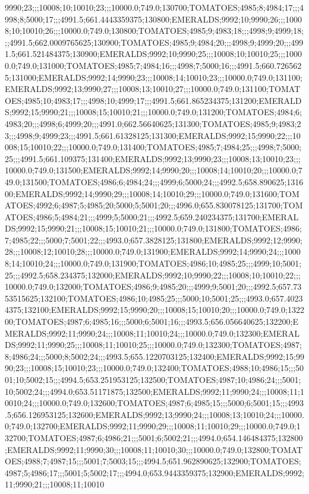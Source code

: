 9990;23;;;10008;10;10010;23;;;10000.0;749.0;130700;TOMATOES;4985;8;4984;17;;;4998;8;5000;17;;;4991.5;661.4443359375;130800;EMERALDS;9992;10;9990;26;;;10008;10;10010;26;;;10000.0;749.0;130800;TOMATOES;4985;9;4983;18;;;4998;9;4999;18;;;4991.5;662.0009765625;130900;TOMATOES;4985;9;4984;20;;;4998;9;4999;20;;;4991.5;661.521484375;130900;EMERALDS;9992;10;9990;25;;;10008;10;10010;25;;;10000.0;749.0;131000;TOMATOES;4985;7;4984;16;;;4998;7;5000;16;;;4991.5;660.7265625;131000;EMERALDS;9992;14;9990;23;;;10008;14;10010;23;;;10000.0;749.0;131100;EMERALDS;9992;13;9990;27;;;10008;13;10010;27;;;10000.0;749.0;131100;TOMATOES;4985;10;4983;17;;;4998;10;4999;17;;;4991.5;661.865234375;131200;EMERALDS;9992;15;9990;21;;;10008;15;10010;21;;;10000.0;749.0;131200;TOMATOES;4984;6;4983;20;;;4998;6;4999;20;;;4991.0;662.56640625;131300;TOMATOES;4985;9;4983;23;;;4998;9;4999;23;;;4991.5;661.61328125;131300;EMERALDS;9992;15;9990;22;;;10008;15;10010;22;;;10000.0;749.0;131400;TOMATOES;4985;7;4984;25;;;4998;7;5000;25;;;4991.5;661.109375;131400;EMERALDS;9992;13;9990;23;;;10008;13;10010;23;;;10000.0;749.0;131500;EMERALDS;9992;14;9990;20;;;10008;14;10010;20;;;10000.0;749.0;131500;TOMATOES;4986;6;4984;24;;;4999;6;5000;24;;;4992.5;658.890625;131600;EMERALDS;9992;14;9990;29;;;10008;14;10010;29;;;10000.0;749.0;131600;TOMATOES;4992;6;4987;5;4985;20;5000;5;5001;20;;;4996.0;655.830078125;131700;TOMATOES;4986;5;4984;21;;;4999;5;5000;21;;;4992.5;659.240234375;131700;EMERALDS;9992;15;9990;21;;;10008;15;10010;21;;;10000.0;749.0;131800;TOMATOES;4986;7;4985;22;;;5000;7;5001;22;;;4993.0;657.3828125;131800;EMERALDS;9992;12;9990;28;;;10008;12;10010;28;;;10000.0;749.0;131900;EMERALDS;9992;14;9990;24;;;10008;14;10010;24;;;10000.0;749.0;131900;TOMATOES;4986;10;4985;25;;;4999;10;5001;25;;;4992.5;658.234375;132000;EMERALDS;9992;10;9990;22;;;10008;10;10010;22;;;10000.0;749.0;132000;TOMATOES;4986;9;4985;20;;;4999;9;5001;20;;;4992.5;657.7353515625;132100;TOMATOES;4986;10;4985;25;;;5000;10;5001;25;;;4993.0;657.40234375;132100;EMERALDS;9992;15;9990;20;;;10008;15;10010;20;;;10000.0;749.0;132200;TOMATOES;4987;6;4985;16;;;5000;6;5001;16;;;4993.5;656.056640625;132200;EMERALDS;9992;11;9990;24;;;10008;11;10010;24;;;10000.0;749.0;132300;EMERALDS;9992;11;9990;25;;;10008;11;10010;25;;;10000.0;749.0;132300;TOMATOES;4987;8;4986;24;;;5000;8;5002;24;;;4993.5;655.1220703125;132400;EMERALDS;9992;15;9990;23;;;10008;15;10010;23;;;10000.0;749.0;132400;TOMATOES;4988;10;4986;15;;;5001;10;5002;15;;;4994.5;653.251953125;132500;TOMATOES;4987;10;4986;24;;;5001;10;5002;24;;;4994.0;653.51171875;132500;EMERALDS;9992;11;9990;24;;;10008;11;10010;24;;;10000.0;749.0;132600;TOMATOES;4987;6;4985;15;;;5000;6;5001;15;;;4993.5;656.126953125;132600;EMERALDS;9992;13;9990;24;;;10008;13;10010;24;;;10000.0;749.0;132700;EMERALDS;9992;11;9990;29;;;10008;11;10010;29;;;10000.0;749.0;132700;TOMATOES;4987;6;4986;21;;;5001;6;5002;21;;;4994.0;654.146484375;132800;EMERALDS;9992;11;9990;30;;;10008;11;10010;30;;;10000.0;749.0;132800;TOMATOES;4988;7;4987;15;;;5001;7;5003;15;;;4994.5;651.962890625;132900;TOMATOES;4987;5;4986;17;;;5001;5;5002;17;;;4994.0;653.9443359375;132900;EMERALDS;9992;11;9990;21;;;10008;11;10010